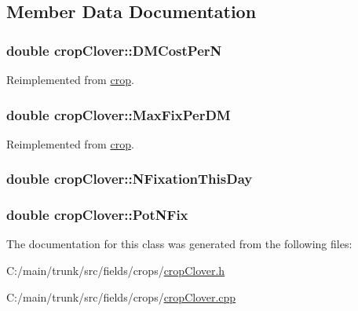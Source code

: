 \subsection{Member Data Documentation}
\hypertarget{classcrop_clover_a9b3c11041d71e6050fe2831c22318ed3}{
\subsubsection[{DMCostPerN}]{\setlength{\rightskip}{0pt plus 5cm}double {\bf cropClover::DMCostPerN}}}
\label{classcrop_clover_a9b3c11041d71e6050fe2831c22318ed3}


Reimplemented from \hyperlink{classcrop_af06dc09d391a57692b440c7c492dbc41}{crop}.\hypertarget{classcrop_clover_a1d9dbe99654e2faa451ab20ff6653683}{
\subsubsection[{MaxFixPerDM}]{\setlength{\rightskip}{0pt plus 5cm}double {\bf cropClover::MaxFixPerDM}}}
\label{classcrop_clover_a1d9dbe99654e2faa451ab20ff6653683}


Reimplemented from \hyperlink{classcrop_acd7a9182db99895de016c87785b58cc9}{crop}.\hypertarget{classcrop_clover_a86608517e507f0b9cb914ca4ae9e9293}{
\subsubsection[{NFixationThisDay}]{\setlength{\rightskip}{0pt plus 5cm}double {\bf cropClover::NFixationThisDay}}}
\label{classcrop_clover_a86608517e507f0b9cb914ca4ae9e9293}
\hypertarget{classcrop_clover_a0a358b6c4673755725925ab5cb959059}{
\subsubsection[{PotNFix}]{\setlength{\rightskip}{0pt plus 5cm}double {\bf cropClover::PotNFix}}}
\label{classcrop_clover_a0a358b6c4673755725925ab5cb959059}


The documentation for this class was generated from the following files:\begin{DoxyCompactItemize}
\item 
C:/main/trunk/src/fields/crops/\hyperlink{crop_clover_8h}{cropClover.h}\item 
C:/main/trunk/src/fields/crops/\hyperlink{crop_clover_8cpp}{cropClover.cpp}\end{DoxyCompactItemize}
